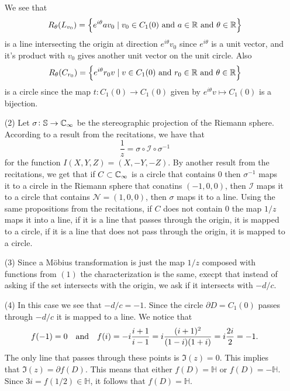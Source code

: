\documentclass[11pt,a4paper]{article}
\begin{document}
\begin{solution}
\begin{enumerate}
    We see that
    \[
      R_{\theta}(L_{v_0}) =
      \set{e^{i \theta} a v_0 \mid v_0 \in C_1(0) \stand a \in \R \stand \theta \in \R}
    \]
    is a line intersecting the origin at direction $e^{i \theta} v_0$
    since $e^{i \theta}$ is a unit vector, and it's product with $v_0$
    gives another unit vector on the unit circle. Also
    \[
      R_{\theta}(C_{r_0}) =
      \set{e^{i \theta} r_0 v \mid
      v \in C_1(0) \stand r_0 \in \R \stand \theta \in \R}
    \]
    is a circle since the map $t \colon C_1(0) \to C_1(0)$ given by
    $e^{i \theta} v \mapsto C_1(0)$ is a bijection.
  \item[(2)] Let $\sigma \colon \mathbb S \to \mathbb{C}_{\infty}$ be the stereographic
    projection of the Riemann sphere.
    According to a result from the recitations,
    we have that
    \[
      \frac{1}{z} = \sigma \circ \mathcal I \circ \sigma^{-1}
    \]
    for the function $I(X,Y,Z) = (X,-Y,-Z)$.
    By another result from the recitations,
    we get that if $C \subset \mathbb{C}_{\infty}$ is a circle that contains $0$
    then $\sigma^{-1}$ maps it to a circle in the Riemann sphere that conatins
    $(-1,0,0)$, then $\mathcal I$ maps it to a circle that contains
    $\mathcal N = (1,0,0)$, then $\sigma$ maps it to a line.
    Using the same propositions from the recitations,
    if $C$ does not contain $0$ the map $1/z$ maps it into a line,
    if it is a line that passes through the origin,
    it is mapped to a circle, if it is a line that does not
    pass through the origin, it is mapped to a circle.
    \item[(3)] Since a M\"obius transformation is just the map $1/z$ composed
    with functions from $(1)$ the characterization is the same,
    execpt that instead of asking if the set intersects with the origin,
    we ask if it intersects with $- d / c$.
  \item[(4)] In this case we see that $- d / c = -1$.
    Since the circle $\partial D = C_1(0)$ passes through $- d / c$ it is
    mapped to a line.
    We notice that
    \[
      f(-1) = 0 \quad \text{and} \quad
      f(i) =
      - i \frac{i + 1}{i - 1} =
      i \frac{(i + 1)^2}{(1 - i)(1 + i)} =
      i \frac{2i}{2} = -1.
    \]
    The only line that passes through these points is $\Im(z) = 0$.
    This implies that $\Im(z) = \partial f(D)$.
    This means that either $f(D) = \mathbb H$ or $f(D) = -\mathbb H$.
    Since $3i = f(1/2) \in \mathbb H$, it follows that $f(D) = \mathbb H$.
\end{enumerate}
\end{solution}
\end{document}
